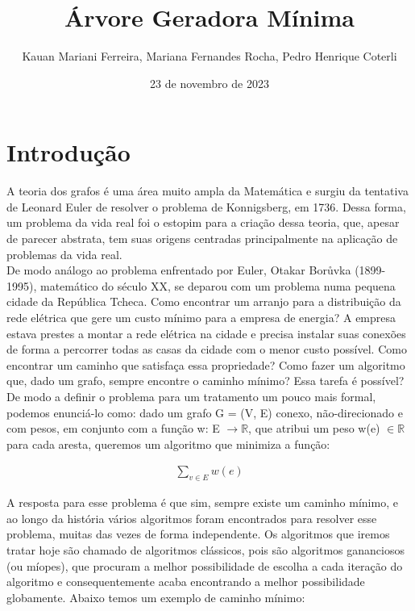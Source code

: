 \documentclass{article}
\title{Árvore Geradora Mínima}
\author{Kauan Mariani Ferreira, Mariana Fernandes Rocha, Pedro Henrique Coterli}
\date{23 de novembro de 2023}
\begin{document}
\maketitle

\section{Introdução}
A teoria dos grafos é uma área muito ampla da Matemática e surgiu da tentativa de Leonard Euler de resolver o problema de Konnigsberg, em 1736. Dessa forma, um problema da vida real foi o estopim para a criação dessa teoria, que, apesar de parecer abstrata, tem suas origens centradas principalmente na aplicação de problemas da vida real.\\

De modo análogo ao problema enfrentado por Euler, Otakar Borůvka (1899-1995), matemático do século XX, se deparou com um problema numa pequena cidade da República Tcheca. Como encontrar um arranjo para a distribuição da rede elétrica que gere um custo mínimo para a empresa de energia? A empresa estava prestes a montar a rede elétrica na cidade e precisa instalar suas conexões de forma a percorrer todas as casas da cidade com o menor custo possível. Como encontrar um caminho que satisfaça essa propriedade? Como fazer um algoritmo que, dado um grafo, sempre encontre o caminho mínimo? Essa tarefa é possível?\\

De modo a definir o problema para um tratamento um pouco mais formal, podemos enunciá-lo como:
dado um grafo G = (V, E) conexo, não-direcionado e com pesos, em conjunto com a função w: E $\rightarrow \mathbb{R}$, que atribui um peso w(e) $\in \mathbb{R}$ para cada aresta, queremos um algoritmo que minimiza a função:

\begin{center}

\begin{gather*}
    \sum_{v \in E} w(e)
\end{gather*}

\end{center}

A resposta para esse problema é que sim, sempre existe um caminho mínimo, e ao longo da história vários algoritmos foram encontrados para resolver esse problema, muitas das vezes de forma independente. Os algoritmos que iremos tratar hoje são chamado de algoritmos clássicos, pois são algoritmos gananciosos (ou míopes), que procuram a melhor possibilidade de escolha a cada iteração do algoritmo e consequentemente acaba encontrando a melhor possibilidade globamente. Abaixo temos um exemplo de caminho mínimo:\\
\end{document}
